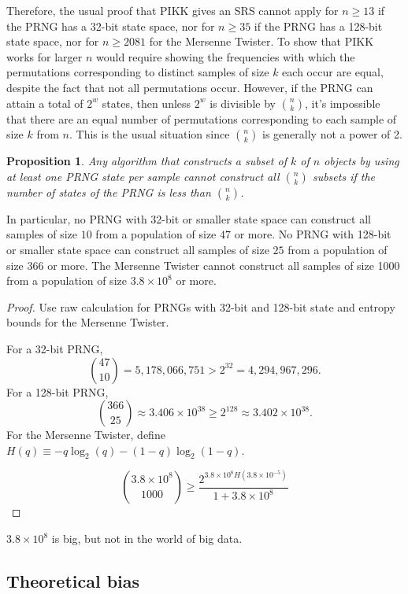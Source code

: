 \documentclass[12pt]{article}
\newtheorem{proposition}[theorem]{Proposition}
\newcommand{\todo}[1]{{\color{red}{TO DO: \sc #1}}}
\begin{document}
Therefore, the usual proof that PIKK gives an SRS cannot apply for $n \ge 13$ if the PRNG has a 32-bit state space, nor for $n \ge 35$ if the PRNG has a 128-bit state space, nor for $n \ge 2081$ for the Mersenne Twister.
To show that PIKK works for larger $n$ would require showing the frequencies with which the permutations corresponding to distinct samples of size $k$ each occur are equal, despite the fact that not all permutations occur.
However, if the PRNG can attain a total of $2^w$ states, then unless $2^w$ is divisible by ${n \choose k}$, it's impossible that there are an equal number of permutations corresponding to each sample of size $k$ from $n$. 
This is the usual situation since ${n \choose k }$ is generally not a power of 2.



\begin{proposition}
Any algorithm that constructs a subset of $k$ of $n$ objects by using at least one PRNG state per sample cannot construct all $n \choose k$ subsets if the number of states of the PRNG is less than $n \choose k$.
\end{proposition}

In particular, no PRNG with 32-bit or smaller state space can construct all samples of size $10$ from a population of size $47$ or more. 
No PRNG with 128-bit or smaller state space can construct all samples of size $25$ from a population of size $366$ or more. 
The Mersenne Twister cannot construct all samples of size 1000 from a population of size $3.8 \times 10^8$ or more.

\begin{proof}
Use raw calculation for PRNGs with 32-bit and 128-bit state and entropy bounds for the Mersenne Twister.

For a 32-bit PRNG,
$${47\choose10} = 5,178,066,751>  2^{32} = 4,294,967,296 .$$
For a 128-bit PRNG,
$${366\choose25} \approx 3.406 \times 10^{38} \ge 2^{128} \approx 3.402 \times 10^{38}.$$
For the Mersenne Twister,
define $H(q) \equiv -q\log_2(q) - (1-q)\log_2(1-q)$.

$${3.8 \times 10^8 \choose 1000} \geq \frac{2^{ 3.8 \times 10^8 H(3.8 \times 10^{-5})}}{1 + 3.8 \times 10^8}$$

\todo{flesh out}
\end{proof}

$3.8 \times 10^8$ is big, but not in the world of big data.

\subsection{Theoretical bias}
\end{document}
